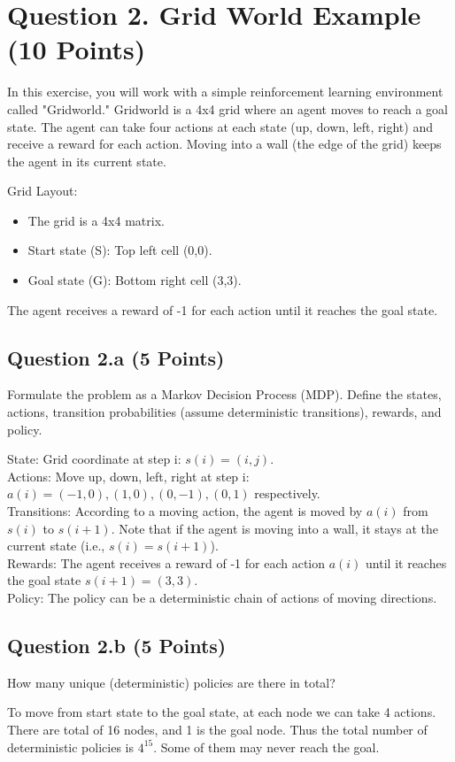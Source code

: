 \documentclass[12pt]{article}
\begin{document}
\section*{Question 2. Grid World Example (10 Points)}

In this exercise, you will work with a simple reinforcement learning environment called "Gridworld." Gridworld is a 4x4 grid where an agent moves to reach a goal state. The agent can take four actions at each state (up, down, left, right) and receive a reward for each action. Moving into a wall (the edge of the grid) keeps the agent in its current state.

Grid Layout:
\begin{itemize}
\item The grid is a 4x4 matrix.
\item Start state (S): Top left cell (0,0).
\item Goal state (G): Bottom right cell (3,3).
\end{itemize}
The agent receives a reward of -1 for each action until it reaches the goal state.


\subsection*{Question 2.a (5 Points)}
Formulate the problem as a Markov Decision Process (MDP). Define the states, actions, transition probabilities (assume deterministic transitions), rewards, and policy.
\begin{solution}
State: Grid coordinate at step i: $s(i)=(i, j)$.\\
Actions: Move up, down, left, right at step i: $a(i) = {(-1, 0), (1,0), (0, -1), (0,1)}$ respectively. \\
Transitions: According to a moving action, the agent is moved by $a(i)$ from $s(i)$ to $s(i+1)$. Note that if the agent is moving into a wall, it stays at the current state (i.e., $s(i)=s(i+1)$).\\
Rewards: The agent receives a reward of -1 for each action $a(i)$ until it reaches the goal state $s(i+1) = (3,3)$.\\
Policy: The policy can be a deterministic chain of actions of moving directions.
\end{solution}

\subsection*{Question 2.b (5 Points)} How many unique (deterministic) policies are there in total?
\begin{solution}
To move from start state to the goal state, at each node we can take 4 actions. There are total of 16 nodes, and 1 is the goal node. Thus the total number of deterministic policies is $4^{15}$. Some of them may never reach the goal.
\end{solution}
\end{document}
